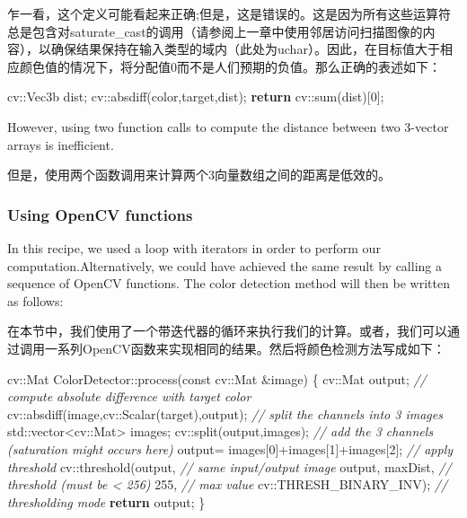 \documentclass[]{article}
\newenvironment{Shaded}{}{}
\newcommand{\AttributeTok}[1]{\textcolor[rgb]{0.49,0.56,0.16}{#1}}
\newcommand{\BuiltInTok}[1]{#1}
\newcommand{\CommentTok}[1]{\textcolor[rgb]{0.38,0.63,0.69}{\textit{#1}}}
\newcommand{\ControlFlowTok}[1]{\textcolor[rgb]{0.00,0.44,0.13}{\textbf{#1}}}
\newcommand{\DecValTok}[1]{\textcolor[rgb]{0.25,0.63,0.44}{#1}}
\newcommand{\NormalTok}[1]{#1}
\begin{document}
乍一看，这个定义可能看起来正确;但是，这是错误的。这是因为所有这些运算符总是包含对saturate\_cast的调用（请参阅上一章中使用邻居访问扫描图像的内容），以确保结果保持在输入类型的域内（此处为uchar）。因此，在目标值大于相应颜色值的情况下，将分配值0而不是人们预期的负值。那么正确的表述如下：

\begin{Shaded}
\begin{Highlighting}[]
\NormalTok{cv::Vec3b dist;}
\NormalTok{cv::absdiff(color,target,dist);}
\ControlFlowTok{return}\NormalTok{ cv::sum(dist)[}\DecValTok{0}\NormalTok{];}
\end{Highlighting}
\end{Shaded}

However, using two function calls to compute the distance between two
3-vector arrays is inefficient.

但是，使用两个函数调用来计算两个3向量数组之间的距离是低效的。

\hypertarget{header-n1231}{%
\subsubsection{Using OpenCV functions }\label{header-n1231}}

In this recipe, we used a loop with iterators in order to perform our
computation.Alternatively, we could have achieved the same result by
calling a sequence of OpenCV functions. The color detection method will
then be written as follows:

在本节中，我们使用了一个带迭代器的循环来执行我们的计算。或者，我们可以通过调用一系列OpenCV函数来实现相同的结果。然后将颜色检测方法写成如下：

\begin{Shaded}
\begin{Highlighting}[]
\NormalTok{cv::Mat ColorDetector::process(}\AttributeTok{const}\NormalTok{ cv::Mat &image) \{}
\NormalTok{    cv::Mat output;}
    \CommentTok{// compute absolute difference with target color}
\NormalTok{    cv::absdiff(image,cv::Scalar(target),output);}
    \CommentTok{// split the channels into 3 images}
    \BuiltInTok{std::}\NormalTok{vector<cv::Mat> images;}
\NormalTok{    cv::split(output,images);}
    \CommentTok{// add the 3 channels (saturation might occurs here)}
\NormalTok{    output= images[}\DecValTok{0}\NormalTok{]+images[}\DecValTok{1}\NormalTok{]+images[}\DecValTok{2}\NormalTok{];}
    \CommentTok{// apply threshold}
\NormalTok{    cv::threshold(output, }\CommentTok{// same input/output image}
\NormalTok{                  output,}
\NormalTok{                  maxDist, }\CommentTok{// threshold (must be < 256)}
                  \DecValTok{255}\NormalTok{, }\CommentTok{// max value}
\NormalTok{                  cv::THRESH_BINARY_INV); }\CommentTok{// thresholding mode}
    \ControlFlowTok{return}\NormalTok{ output;}
\NormalTok{\}}
\end{Highlighting}
\end{Shaded}
\end{document}
